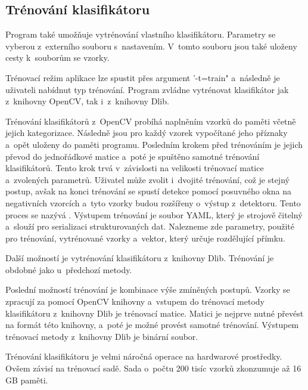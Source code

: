 \subsection{Trénování klasifikátoru}
Program také umožňuje vytrénování vlastního klasifikátoru. Parametry se vyberou z~externího souboru s~nastavením. V~tomto souboru jsou také uloženy cesty k~souborům se vzorky. 

Trénovací režim aplikace lze spustit přes argument '-t=train" a~následně je uživateli nabídnut typ trénování. Program zvládne vytrénovat klasifikátor jak z~knihovny OpenCV, tak i~z~knihovny Dlib. 

Trénování klasifikátorů z~OpenCV probíhá naplněním vzorků do paměti včetně jejich kategorizace. Následně jsou pro každý vzorek vypočítané jeho příznaky a~opět uloženy do paměti programu. Posledním krokem před trénováním je jejich převod do jednořádkové matice a~poté je spuštěno samotné trénování klasifikátorů. Tento krok trvá v~závislosti na velikosti trénovací matice a~zvolených parametrů. Uživatel může zvolit i~dvojité trénování, což je stejný postup, avšak na konci trénování se spustí detekce pomocí posuvného okna na negativních vzorcích a~tyto vzorky budou rozšířeny o~výstup z~detektoru. Tento proces se nazývá  \cite{bootstrap}. Výstupem trénování je soubor YAML, který je strojově čitelný a~slouží pro serializaci strukturovaných dat. Nalezneme zde parametry, použité pro trénování, vytrénované vzorky a~vektor, který určuje rozdělující přímku.

Další možností je vytrénování klasifikátoru z~knihovny Dlib. Trénování je obdobné jako u~předchozí metody. %

Poslední možností trénování je kombinace výše zmíněných postupů. Vzorky se zpracují za pomocí OpenCV knihovny a~vstupem do trénovací metody klasifikátoru z~knihovny Dlib je trénovací matice. Matici je nejprve nutné převést na formát této knihovny, a~poté je možné provést samotné trénování.
Výstupem trénovací metody z~knihovny Dlib je binární soubor.

Trénování klasifikátoru je velmi náročná operace na hardwarové prostředky. Ovšem závisí na trénovací sadě. Sada o~počtu 200 tisíc vzorků zkonzumuje až 16 GB paměti.

